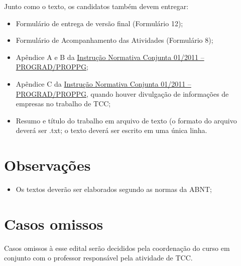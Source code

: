 \documentclass[a4paper, 12pt]{article}
\begin{document}
 	Junto como o texto, os candidatos também devem entregar:
	
	\begin{itemize}
		\item Formulário de entrega de versão final (Formulário 12);
		\item Formulário de Acompanhamento das Atividades (Formulário 8);		
		\item Apêndice A e B da \href{http://www.utfpr.edu.br/cursos/coordenacoes/stricto-sensu/ppgta/documentos/normas-para-entrega-da-versao-final/in-conjunta-01-2011-2013-prograd-proppg-dissertacao.pdf/view}{Instrução Normativa Conjunta 01/2011 – PROGRAD/PROPPG};
		\item Apêndice C da \href{http://www.utfpr.edu.br/cursos/coordenacoes/stricto-sensu/ppgta/documentos/normas-para-entrega-da-versao-final/in-conjunta-01-2011-2013-prograd-proppg-dissertacao.pdf/view}{Instrução Normativa Conjunta 01/2011 – PROGRAD/PROPPG}, quando houver divulgação de informações de empresas no trabalho de TCC;
		\item Resumo e título do trabalho em arquivo de texto (o formato do arquivo deverá ser .txt; o texto deverá ser escrito em uma única linha.
	\end{itemize}
	
	\section{Observações}
	
	\begin{itemize}
		\item Os textos deverão ser elaborados segundo as normas da ABNT;
		
	\end{itemize}

	\section{Casos omissos}
	
	Casos omissos à esse edital serão decididos pela coordenação do curso em conjunto com o professor responsável pela atividade de TCC.
	
	
	
	
	
	
	
	

    
\end{document}

